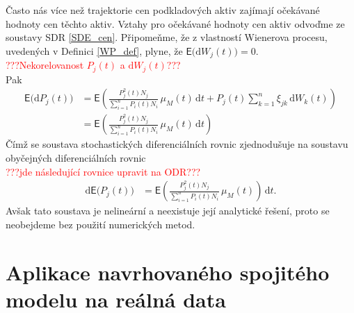 \documentclass[a4paper,12pt]{report}
\theoremstyle{definition} \newtheorem{definice}[veta]{Definice}
\theoremstyle{remark}
\begin{document}
Často nás více než trajektorie cen podkladových aktiv zajímají očekávané hodnoty cen těchto aktiv.
Vztahy pro očekávané hodnoty cen aktiv odvoďme ze soustavy SDR \eqref{SDE_cen}.
Připomeňme, že z vlastností Wienerova procesu, uvedených v Definici \ref{WP_def}, plyne, že $\mathsf{E}\big(\mathrm{d}W_j(t)\big)=0$.
\\
\textcolor{red}{???Nekorelovanost $P_j(t)$ a $\mathrm{d}W_j(t)$???}
\\
Pak
\begin{align*}%
\mathsf{E}\big( \mathrm{d}P_j(t)\big)&	=\mathsf{E}\left(\frac{P_j^2(t)N_j}{\sum_{i=1}^n P_i(t)N_i}\, \mu_M(t)\,\mathrm{d}t+P_j(t)\sum_{k=1}^{n}\xi_{jk}\,\mathrm{d}W_k(t)\right)\\
&=\mathsf{E}\left(\frac{P_j^2(t)N_j}{\sum_{i=1}^n P_i(t)N_i}\, \mu_M(t)\,\mathrm{d}t\right)
\end{align*}
Čímž se soustava stochastických diferenciálních rovnic zjednodušuje na soustavu obyčejných diferenciálních rovnic
\\
\textcolor{red}{???jde následující rovnice upravit na ODR???}
\\
\begin{align*}
\mathrm{d}\mathsf{E}\big(P_j(t)\big)&=\mathsf{E}\left(\frac{P_j^2(t)N_j}{\sum_{i=1}^n P_i(t)N_i}\, \mu_M(t)\right)\,\mathrm{d}t.
\end{align*}
Avšak tato soustava je nelineární a neexistuje její analytické řešení, proto se neobejdeme bez použití numerických metod.


\section{Aplikace navrhovaného spojitého modelu na reálná data}\label{aplikace}
\end{document}

